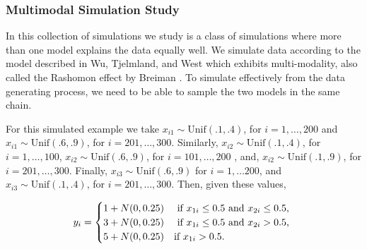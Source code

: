 %

\subsubsection{Multimodal Simulation Study}
In this collection of simulations we study is a class of simulations where more than one model explains the data equally well. We simulate data according to the model described in Wu, Tjelmland, and West \cite{wu2007bayesian} which exhibits multi-modality, also called the Rashomon effect by Breiman \cite{breiman2001statistical}. To simulate effectively from the data generating process, we need to be able to sample the two models in the same chain. 

For this simulated example we take $x_{i1} \sim \text{Unif}(.1,.4)$, for $i=1,\dots ,200$ and $x_{i1} \sim \text{Unif}(.6,.9)$, for $i=201,\dots,300$. Similarly, $x_{i2} \sim \text{Unif}(.1,.4)$, for $i=1,\dots ,100$, $x_{i2} \sim \text{Unif}(.6,.9)$, for $i=101, \dots,200$ , and, $x_{i2} \sim \text{Unif}(.1,.9)$, for $i=201, \dots,300$. Finally, $x_{i3} \sim \text{Unif}(.6,.9)$ for $i =1, \dots 200$, and $x_{i3} \sim \text{Unif}(.1,.4)$, for $i=201, \dots,300$. Then, given these values, 

\[
 y_i =
  \begin{cases} 
      \hfill 1+N(0,0.25)    \hfill & \text{ if $x_{1i} \leq 0.5$ and $x_{2i} \leq 0.5$, } \\
      \hfill 3+ N(0,0.25) \hfill & \text{ if $x_{1i} \leq 0.5$ and $x_{2i} > 0.5$, } \\
      \hfill 5+ N(0,0.25) \hfill & \text{if $x_{1i} > 0.5$. }\\
  \end{cases}
\]

